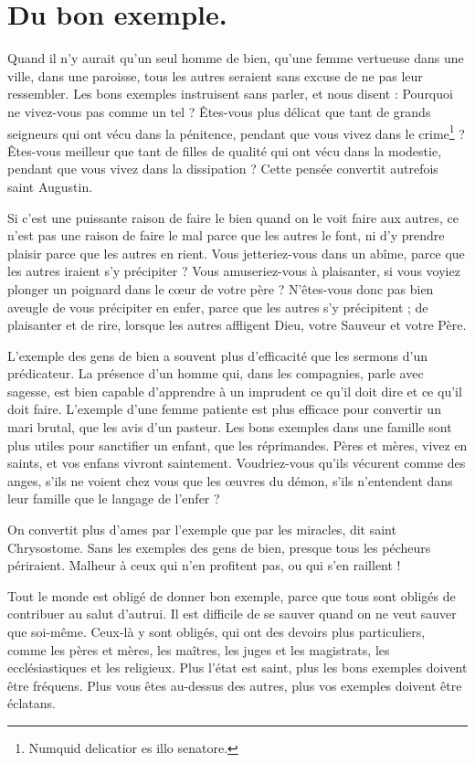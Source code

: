 \documentclass[instructions.tex]{subfiles}
\begin{document}
 
\chapter{Du bon exemple.}
 
\primo Quand il n’y aurait qu’un seul homme de bien, qu’une femme vertueuse dans une ville, dans une paroisse, tous les autres seraient sans excuse de ne pas leur ressembler. Les bons exemples instruisent sans parler, et nous disent : Pourquoi ne vivez-vous pas comme un tel ? Êtes-vous plus délicat que tant de grands seigneurs qui ont vécu dans la pénitence, pendant que vous vivez dans le crime\footnote{Numquid delicatior es illo senatore.} ? Êtes-vous meilleur que tant de filles de qualité qui ont vécu dans la modestie, pendant que vous vivez dans la dissipation ? Cette pensée convertit autrefois saint Augustin.
 
Si c’est une puissante raison de faire le bien quand on le voit faire aux autres, ce n’est pas une raison de faire le mal parce que les autres le font, ni d’y prendre plaisir parce que les autres en rient. Vous jetteriez-vous dans un abîme, parce que les autres iraient s’y précipiter ? Vous amuseriez-vous à plaisanter, si vous voyiez plonger un poignard dans le cœur de votre père ? N’êtes-vous donc pas bien aveugle de vous précipiter en enfer, parce que les autres s’y précipitent ; de plaisanter et de rire, lorsque les autres affligent Dieu, votre Sauveur et votre Père.
 
L’exemple des gens de bien a souvent plus d’efficacité que les sermons d’un prédicateur. La présence d’un homme qui, dans les compagnies, parle avec sagesse, est bien capable d’apprendre à un imprudent ce qu’il doit dire et ce qu’il doit faire. L’exemple d’une femme patiente est plus efficace pour convertir un mari brutal, que les avis d’un pasteur. Les bons exemples dans une famille sont plus utiles pour sanctifier un enfant, que les réprimandes. Pères et mères, vivez en saints, et vos enfans vivront saintement. Voudriez-vous qu’ils vécurent comme des anges, s’ils ne voient chez vous que les œuvres du démon, s’ils n’entendent dans leur famille que le langage de l’enfer ?
 
On convertit plus d’ames par l’exemple que par les miracles, dit saint Chrysostome. Sans les exemples des gens de bien, presque tous les pécheurs périraient. Malheur à ceux qui n’en profitent pas, ou qui s’en raillent !
 
\secundo Tout le monde est obligé de donner bon exemple, parce que tous sont obligés de contribuer au salut d’autrui. Il est difficile de se sauver quand on ne veut sauver que soi-même. Ceux-là y sont obligés, qui ont des devoirs plus particuliers, comme les pères et mères, les maîtres, les juges et les magistrats, les ecclésiastiques et les religieux. Plus l’état est saint, plus les bons exemples doivent être fréquens. Plus vous êtes au-dessus des autres, plus vos exemples doivent être éclatans.
 
\end{document}
